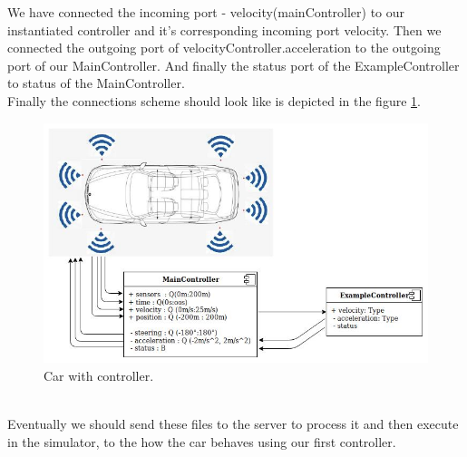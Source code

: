 \bigskip
We have connected the incoming port - velocity(mainController) to our instantiated controller and it's corresponding incoming port velocity. Then we connected the outgoing port of velocityController.acceleration to the outgoing port of our MainController. And finally the status port of the ExampleController to status of the MainController.\\
Finally the connections scheme should look like is depicted in the figure \ref{fig:controller}.
\begin{figure}[h!]
    \centering
    \includegraphics[width=\linewidth]{src/pic/car-with-controller}
    \caption{Car with controller.}
    \label{fig:controller}
\end{figure} \\
Eventually we should send these files to the server to process it and then execute in the simulator, to the how the car behaves using our first controller.
